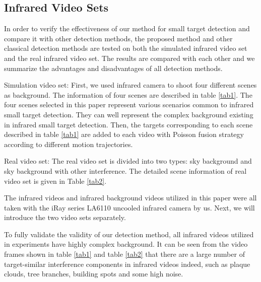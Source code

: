 \documentclass[journal]{IEEEtran}
\begin{document}
\subsection{Infrared Video Sets}
In order to verify the effectiveness of our method for small target detection and compare it with other detection methods, the proposed method and other classical detection methods are tested on both the simulated infrared video set and the real infrared video set. The results are compared with each other and we summarize the advantages and disadvantages of all detection methods.

Simulation video set: First, we used infrared camera to shoot four different scenes as background. The information of four scenes are described in table \ref{tab1}. The four scenes selected in this paper represent various scenarios common to infrared small target detection. They can well represent the complex background existing in infrared small target detection. Then, the targets corresponding to each scene described in table \ref{tab1} are added to each video with Poisson fusion strategy\cite{perez2003poisson} according to different motion trajectories.

Real video set: The real video set is divided into two types: sky background and sky background with other interference. The detailed scene information of real video set is given in Table \ref{tab2}.

The infrared videos and infrared background videos utilized in this paper were all taken with the iRay series LA6110 uncooled infrared camera by us. Next, we will introduce the two video sets separately.

To fully validate the validity of our detection method, all infrared videos utilized in experiments have highly complex background. It can be seen from the video frames shown in table \ref{tab1} and table \ref{tab2} that there are a large number of target-similar interference components in infrared videos indeed, such as plaque clouds, tree branches, building spots and some high noise.
\end{document}

